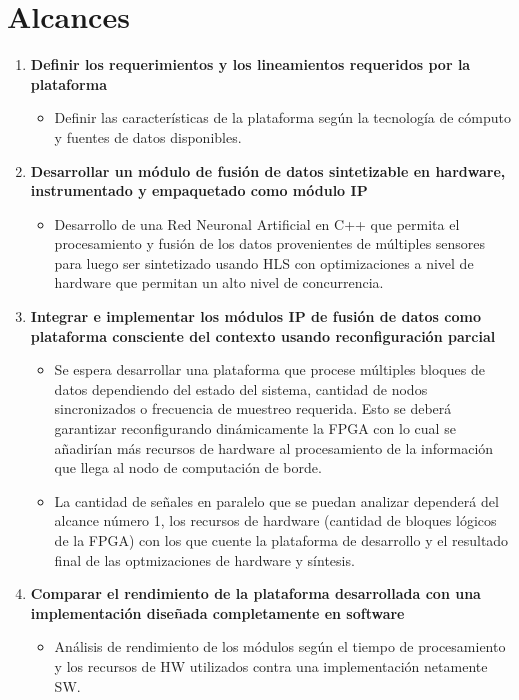 
\chapter{Alcances} %
\label{Chapter5}

\begin{enumerate}
\item \textbf{Definir los requerimientos y los lineamientos requeridos por la plataforma}
\begin{itemize}
\item Definir las características de la plataforma según la tecnología de cómputo y fuentes de datos disponibles.
\end{itemize}
\item \textbf{Desarrollar un módulo de fusión de datos sintetizable en hardware, instrumentado y empaquetado como módulo IP}
\begin{itemize}
\item Desarrollo de una Red Neuronal Artificial en C++ que permita el procesamiento y fusión de los datos provenientes de múltiples sensores para luego ser sintetizado usando HLS con optimizaciones a nivel de hardware que permitan un alto nivel de concurrencia.
\end{itemize}
\item  \textbf{Integrar e implementar los módulos IP de fusión de datos como plataforma consciente del contexto usando reconfiguración parcial}
\begin{itemize}
\item Se espera desarrollar una plataforma que procese múltiples bloques de datos dependiendo del estado del sistema, cantidad de nodos sincronizados o frecuencia de muestreo requerida. Esto se deberá garantizar reconfigurando dinámicamente la FPGA con lo cual se añadirían más recursos de hardware al procesamiento de la información que llega al nodo de computación de borde.
\item La cantidad de señales en paralelo que se puedan analizar dependerá del alcance número 1, los recursos de hardware (cantidad de bloques lógicos de la FPGA) con los que cuente la plataforma de desarrollo y el resultado final de las optmizaciones de hardware y síntesis.
\end{itemize}
\item  \textbf{Comparar el rendimiento de la plataforma desarrollada con una implementación diseñada completamente en software}
\begin{itemize}
\item Análisis de rendimiento de los módulos según el tiempo de procesamiento y los recursos de HW utilizados contra una implementación netamente SW.
\end{itemize}

\end{enumerate}
